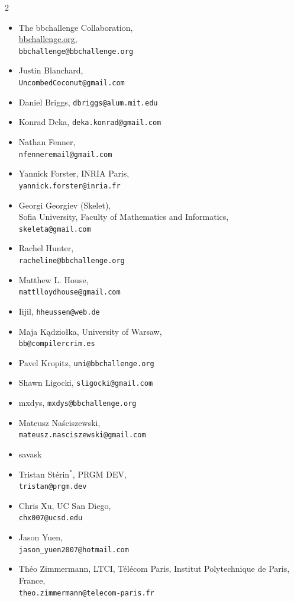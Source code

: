\documentclass[a4paper,british]{article}
\theoremstyle{definition} %
\numberwithin{equation}{section}
\theoremstyle{definition} %
\begin{document}
{\small\raggedright
    \begin{multicols}{2}
        \begin{itemize}\setlength{\itemsep}{1pt}\setlength{\parskip}{0pt}
            \item The bbchallenge Collaboration,\\ \url{bbchallenge.org},\\ \texttt{bbchallenge@bbchallenge.org}
            \item Justin Blanchard,\\ \texttt{UncombedCoconut@gmail.com}
            \item Daniel Briggs, \texttt{dbriggs@alum.mit.edu}
            \item Konrad Deka, \texttt{deka.konrad@gmail.com}
            \item Nathan Fenner,\\ \texttt{nfenneremail@gmail.com}
            \item Yannick Forster, INRIA Paris,\\ \texttt{yannick.forster@inria.fr}
            \item Georgi Georgiev (Skelet),\\ Sofia University, Faculty of Mathematics and Informatics,\\ \texttt{skeleta@gmail.com}
            \item Rachel Hunter,\\ \texttt{racheline@bbchallenge.org}
            \item Matthew L. House,\\ \texttt{mattlloydhouse@gmail.com}
            \item Iijil, \texttt{hheussen@web.de}
            \item Maja Kądziołka, University of Warsaw,\\ \texttt{bb@compilercrim.es}
            \item Pavel Kropitz, \texttt{uni@bbchallenge.org}
            \item Shawn Ligocki, \texttt{sligocki@gmail.com}
            \item mxdys, \texttt{mxdys@bbchallenge.org}
            \item Mateusz Na\'{s}ciszewski,\\ \texttt{mateusz.nasciszewski@gmail.com}
            \item savask
            \item Tristan Stérin$^{\ast}$, PRGM DEV,\\ \texttt{tristan@prgm.dev}
            \item Chris Xu, UC San Diego,\\ \texttt{chx007@ucsd.edu}
            \item Jason Yuen,\\ \texttt{jason\_yuen2007@hotmail.com}
            \item Théo Zimmermann, LTCI, Télécom Paris, Institut Polytechnique de Paris, France,\\ \texttt{theo.zimmermann@telecom-paris.fr}
        \end{itemize}
    \end{multicols}
}
\vspace{-4ex}
\end{document}
